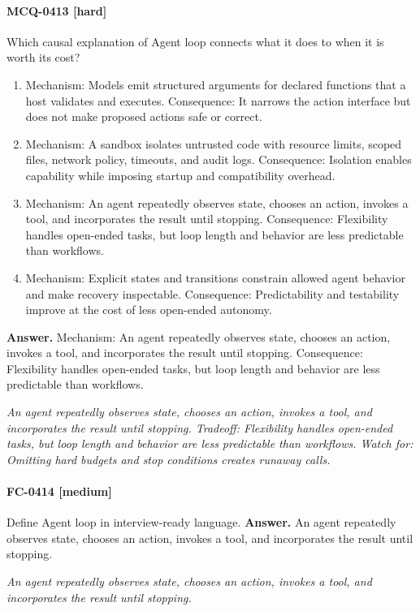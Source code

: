 \paragraph{MCQ-0413 [hard]} Which causal explanation of Agent loop connects what it does to when it is worth its cost?
\begin{enumerate}[label=\Alph*.]
\item Mechanism: Models emit structured arguments for declared functions that a host validates and executes. Consequence: It narrows the action interface but does not make proposed actions safe or correct.
\item Mechanism: A sandbox isolates untrusted code with resource limits, scoped files, network policy, timeouts, and audit logs. Consequence: Isolation enables capability while imposing startup and compatibility overhead.
\item Mechanism: An agent repeatedly observes state, chooses an action, invokes a tool, and incorporates the result until stopping. Consequence: Flexibility handles open-ended tasks, but loop length and behavior are less predictable than workflows.
\item Mechanism: Explicit states and transitions constrain allowed agent behavior and make recovery inspectable. Consequence: Predictability and testability improve at the cost of less open-ended autonomy.
\end{enumerate}
\noindent\textbf{Answer.} Mechanism: An agent repeatedly observes state, chooses an action, invokes a tool, and incorporates the result until stopping. Consequence: Flexibility handles open-ended tasks, but loop length and behavior are less predictable than workflows.
\par\textit{An agent repeatedly observes state, chooses an action, invokes a tool, and incorporates the result until stopping. Tradeoff: Flexibility handles open-ended tasks, but loop length and behavior are less predictable than workflows. Watch for: Omitting hard budgets and stop conditions creates runaway calls.}
\paragraph{FC-0414 [medium]} Define Agent loop in interview-ready language.
\noindent\textbf{Answer.} An agent repeatedly observes state, chooses an action, invokes a tool, and incorporates the result until stopping.
\par\textit{An agent repeatedly observes state, chooses an action, invokes a tool, and incorporates the result until stopping.}
